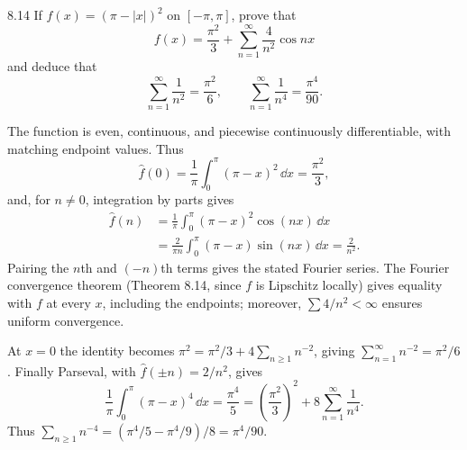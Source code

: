 \documentclass[11pt, oneside]{article}
\begin{document}
\begin{exercise}{8.14}
If $f(x)=(\pi-|x|)^2$ on $[-\pi, \pi]$, prove that
\[
 f(x)=\frac{\pi^2}{3}+\sum_{n=1}^\infty\frac4{n^2}\cos nx
\]
and deduce that
\[
 \sum_{n=1}^\infty\frac1{n^2}=\frac{\pi^2}{6}, \qquad
 \sum_{n=1}^\infty\frac1{n^4}=\frac{\pi^4}{90}.
\]
\end{exercise}
\begin{solution}
The function is even, continuous, and piecewise continuously differentiable, with matching endpoint values. Thus
\[
 \widehat f(0)=\frac1\pi\int_0^\pi(\pi-x)^2\,\dd x=\frac{\pi^2}{3},
\]
and, for $n\ne0$, integration by parts gives
\[
 \begin{aligned}
 \widehat f(n)
 &=\frac1\pi\int_0^\pi(\pi-x)^2\cos(nx)\,\dd x\\
 &=\frac2{\pi n}\int_0^\pi(\pi-x)\sin(nx)\,\dd x
 =\frac2{n^2}.
 \end{aligned}
\]
Pairing the $n$th and $(-n)$th terms gives the stated Fourier series. The Fourier convergence theorem (Theorem 8.14, since $f$ is Lipschitz locally) gives equality with $f$ at every $x$, including the endpoints; moreover, $\sum4/n^2<\infty$ ensures uniform convergence.

At $x=0$ the identity becomes $\pi^2=\pi^2/3+4\sum_{n\ge1}n^{-2}$, giving $\displaystyle\sum_{n=1}^{\infty}n^{-2}=\pi^2/6$. Finally Parseval, with $\widehat f(\pm n)=2/n^2$, gives
\[
 \frac1\pi\int_0^\pi(\pi-x)^4\,\dd x
 =\frac{\pi^4}{5}
 =\left(\frac{\pi^2}{3}\right)^2+8\sum_{n=1}^\infty\frac1{n^4}.
\]
Thus $\sum_{n\ge1}n^{-4}=(\pi^4/5-\pi^4/9)/8=\pi^4/90$.
\end{solution}
\end{document}
